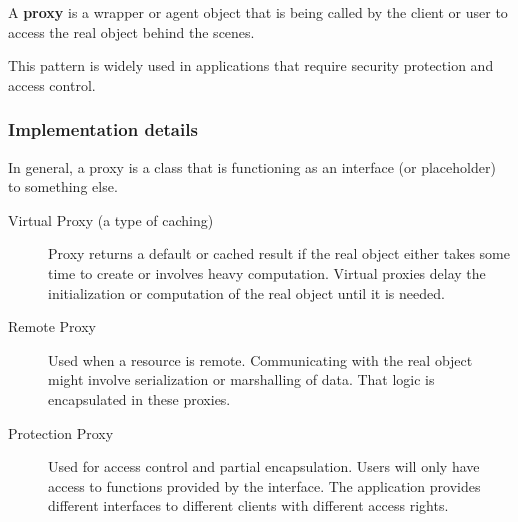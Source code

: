 \begin{summary}
    A {\bf proxy} is a wrapper or agent object that is being called by the
    client or user to access the real object behind the scenes.

    This pattern is widely used in applications that require security
    protection and access control.
\end{summary}

\subsubsection{Implementation details}
In general, a proxy is a class that is functioning as an interface (or
placeholder) to something else. 
\begin{description}
    \item[Virtual Proxy (a type of caching)] Proxy returns a default or cached
        result if the real object either takes some time to create or involves
        heavy computation. Virtual proxies delay the initialization or 
        computation of the real object until it is needed.
    \item[Remote Proxy] Used when a resource is remote. Communicating with the
        real object might involve serialization or marshalling of data. That
        logic is encapsulated in these proxies. 
    \item[Protection Proxy] Used for access control and partial encapsulation.
        Users will only have access to functions provided by the interface. 
        The application provides different interfaces to different clients with
        different access rights.
\end{description}


